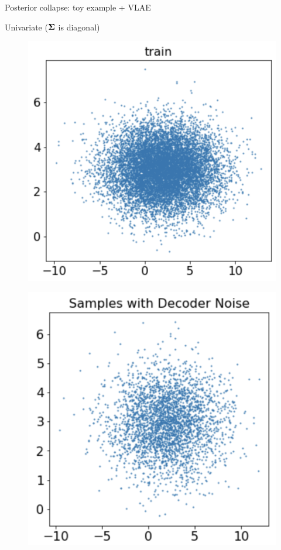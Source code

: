 \begin{frame}{Posterior collapse: toy example + VLAE}
	\begin{block}{Univariate ($\boldsymbol{\Sigma}$ is diagonal)}
		\vspace{-0.5cm}
		\begin{minipage}[t]{0.33\columnwidth}
			\begin{figure}[h]
				\centering
				\includegraphics[width=.8\linewidth]{figs/posterior_collapse_toy_2.png}
			\end{figure}
		\end{minipage}%
		\begin{minipage}[t]{0.33\columnwidth}
			\begin{figure}[h]
				\centering
				\includegraphics[width=.75\linewidth]{figs/posterior_collapse_toy_4.png}

\end{figure}
\end{minipage}
\end{block}
\end{frame}
